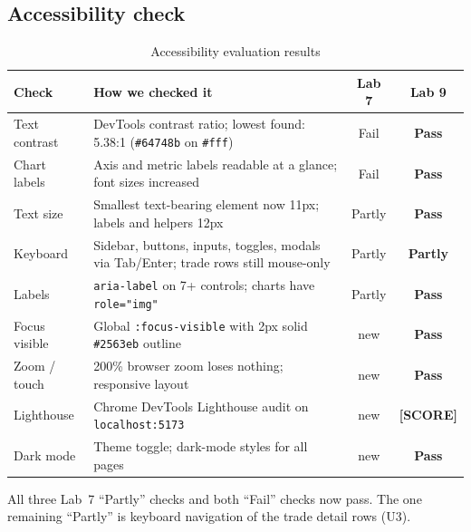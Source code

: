 \documentclass[10pt,a4paper]{article}
\begin{document}
\subsection{Accessibility check}

\begin{table}[H]
\centering
\caption{Accessibility evaluation results}
\label{tab:accessibility}
\begin{tabularx}{\textwidth}{l X c c}
\toprule
\textbf{Check} & \textbf{How we checked it} & \textbf{Lab 7} & \textbf{Lab 9} \\
\midrule
Text contrast &
  DevTools contrast ratio; lowest found: 5.38:1 (\texttt{\#64748b} on \texttt{\#fff}) &
  Fail &
  \textbf{Pass} \\[4pt]
Chart labels &
  Axis and metric labels readable at a glance; font sizes increased &
  Fail &
  \textbf{Pass} \\[4pt]
Text size &
  Smallest text-bearing element now 11px; labels and helpers 12px &
  Partly &
  \textbf{Pass} \\[4pt]
Keyboard &
  Sidebar, buttons, inputs, toggles, modals via Tab/Enter; trade rows still mouse-only &
  Partly &
  \textbf{Partly} \\[4pt]
Labels &
  \texttt{aria-label} on 7+ controls; charts have \texttt{role="img"} &
  Partly &
  \textbf{Pass} \\[4pt]
Focus visible &
  Global \texttt{:focus-visible} with 2px solid \texttt{\#2563eb} outline &
  new &
  \textbf{Pass} \\[4pt]
Zoom / touch &
  200\% browser zoom loses nothing; responsive layout &
  new &
  \textbf{Pass} \\[4pt]
Lighthouse &
  Chrome DevTools Lighthouse audit on \texttt{localhost:5173} &
  new &
  \textbf{[SCORE]} \\[4pt]
Dark mode &
  Theme toggle; dark-mode styles for all pages &
  new &
  \textbf{Pass} \\
\bottomrule
\end{tabularx}
\end{table}

All three Lab~7 ``Partly'' checks and both ``Fail'' checks now pass. The one remaining ``Partly'' is keyboard navigation of the trade detail rows (U3).

\end{document}
